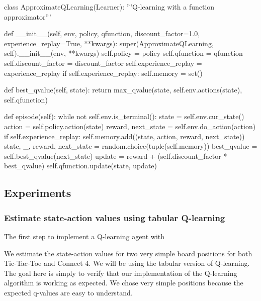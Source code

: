 \documentclass{article}
\begin{document}
\begin{python}
class ApproximateQLearning(Learner):
    '''Q-learning with a function approximator'''

    def __init__(self, env, policy, qfunction, discount_factor=1.0,
                 experience_replay=True, **kwargs):
        super(ApproximateQLearning, self).__init__(env, **kwargs)
        self.policy = policy
        self.qfunction = qfunction
        self.discount_factor = discount_factor
        self.experience_replay = experience_replay
        if self.experience_replay:
            self.memory = set()

    def best_qvalue(self, state):
        return max_qvalue(state, self.env.actions(state), self.qfunction)

    def episode(self):
        while not self.env.is_terminal():
            state = self.env.cur_state()
            action = self.policy.action(state)
            reward, next_state = self.env.do_action(action)
            if self.experience_replay:
                self.memory.add((state, action, reward, next_state))
                state, _, reward, next_state = random.choice(tuple(self.memory))
            best_qvalue = self.best_qvalue(next_state)
            update = reward + (self.discount_factor * best_qvalue)
            self.qfunction.update(state, update)

\end{python}

\subsection{Experiments}

\subsubsection{Estimate state-action values using tabular Q-learning}

The first step to implement a Q-learning agent with 

We estimate the state-action values for two very simple board positions for both Tic-Tac-Toe and
Connect 4. We will be using the tabular version of Q-learning. The goal here is simply to verify
that our implementation of the Q-learning algorithm is working as expected. We chose very simple
positions because the expected q-values are easy to understand.
\end{document}
